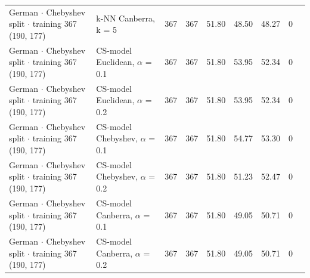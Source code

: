 \begin{longtable}{llrrrrrrl}
  German $\cdot$ Chebyshev split $\cdot$ training 367 (190, 177) & k-NN Canberra, k = 5 & 367 & 367 & 51.80 & 48.50 & 48.27 & 0 &  \\
  German $\cdot$ Chebyshev split $\cdot$ training 367 (190, 177) & CS-model Euclidean, $\alpha$ = 0.1 & 367 & 367 & 51.80 & 53.95 & 52.34 & 0 &  \\
  German $\cdot$ Chebyshev split $\cdot$ training 367 (190, 177) & CS-model Euclidean, $\alpha$ = 0.2 & 367 & 367 & 51.80 & 53.95 & 52.34 & 0 &  \\
  German $\cdot$ Chebyshev split $\cdot$ training 367 (190, 177) & CS-model Chebyshev, $\alpha$ = 0.1 & 367 & 367 & 51.80 & 54.77 & 53.30 & 0 &  \\
  German $\cdot$ Chebyshev split $\cdot$ training 367 (190, 177) & CS-model Chebyshev, $\alpha$ = 0.2 & 367 & 367 & 51.80 & 51.23 & 52.47 & 0 &  \\
  German $\cdot$ Chebyshev split $\cdot$ training 367 (190, 177) & CS-model Canberra, $\alpha$ = 0.1 & 367 & 367 & 51.80 & 49.05 & 50.71 & 0 &  \\
  German $\cdot$ Chebyshev split $\cdot$ training 367 (190, 177) & CS-model Canberra, $\alpha$ = 0.2 & 367 & 367 & 51.80 & 49.05 & 50.71 & 0 &  \\
\end{longtable}
